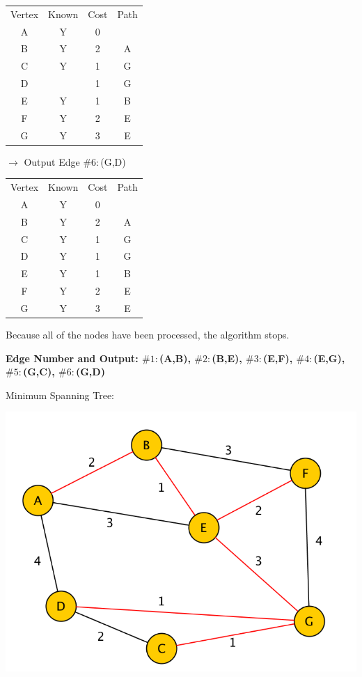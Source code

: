 \documentclass[12pt]{exam}
\begin{document}
\begin{questions}
\begin{parts}
\begin{tabular}{|c c c c|}
\hline
Vertex & Known & Cost & Path \\
A & Y & 0 & \\
B & Y & 2 & A \\
C & Y & 1 & G \\
D & & 1 & G \\
E & Y & 1 & B \\
F & Y & 2 & E \\
G & Y & 3 & E \\
\hline
\end{tabular}
$\rightarrow$ Output Edge $\#6:$(G,D) 

\begin{tabular}{|c c c c|}
\hline
Vertex & Known & Cost & Path \\
A & Y & 0 & \\
B & Y & 2 & A \\
C & Y & 1 & G \\
D & Y & 1 & G \\
E & Y & 1 & B \\
F & Y & 2 & E \\
G & Y & 3 & E \\
\hline
\end{tabular}

Because all of the nodes have been processed, the algorithm stops.

{\bf Edge Number and Output: $\#1:$(A,B), $\#2:$(B,E), $\#3:$(E,F), $\#4:$(E,G), $\#5:$(G,C), $\#6:$(G,D) }

Minimum Spanning Tree:

\includegraphics[scale=0.5]{hw5writeup2a.png}


\end{parts}
\end{questions}
\end{document}
